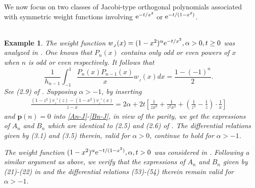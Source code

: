 \documentclass[12pt,a4paper]{article}    %
\newcommand{\e}{{\rm e}}
\newtheorem{exm}{Example}
\numberwithin{equation}{section}
\begin{document}
We now focus on two classes of Jacobi-type orthogonal polynomials associated with symmetric weight functions involving $\e^{-t/x^2}$ or $\e^{-t/(1-x^2)}$.
\\
\\
\begin{exm}
The weight function $w_{_J}(x)=(1-x^2)^{\alpha}\e^{-t/x^2}, \alpha>0,t\geq0$ was analyzed in \cite{MinChenNPB20}. One knows that $P_n(x)$ contains only odd or even powers of $x$ when $n$ is odd or even respectively. It follows that
\vspace{-1mm}
\[\frac{1}{h_{n-1}}\int_{-1}^1 \frac{P_n(x)P_{n-1}(x)}{x}w_{_J}(x)dx=\frac{1-(-1)^n}{2}.\]
See (2.9) of \cite{MinChenNPB20}. Supposing $\alpha>-1$, by inserting
\begin{align*}
\frac{(1-z^2)v_{_J}'(z)-(1-x^2)v_{_J}'(x)}{z-x}=2\alpha+2t\left[\frac{1}{zx^3}+\frac{1}{z^2x^2}+\left(\frac{1}{z^3}-\frac{1}{z}\right)\cdot\frac{1}{x}\right]
\end{align*}
and $\mathbf{p}(n)=0$ into \eqref{An-J}-\eqref{Bn-J}, in view of the parity, we get the expressions of $A_n$ and $B_n$ which are identical to (2.5) and (2.6) of \cite{MinChenNPB20}. The differential relations given by (3.1) and (3.5) therein, valid for $\alpha>0$, continue to hold for $\alpha>-1$.

The weight function  $(1-x^2)^{\alpha}\e^{-t/(1-x^2)}, \alpha,t>0$ was considered in \cite{MinChen21}. Following a similar argument as above, we verify that the expressions of $A_n$ and $B_n$ given by (21)-(22) in \cite{MinChen21} and the differential relations (53)-(54) therein remain valid for $\alpha>-1$.

\end{exm}
\end{document}
